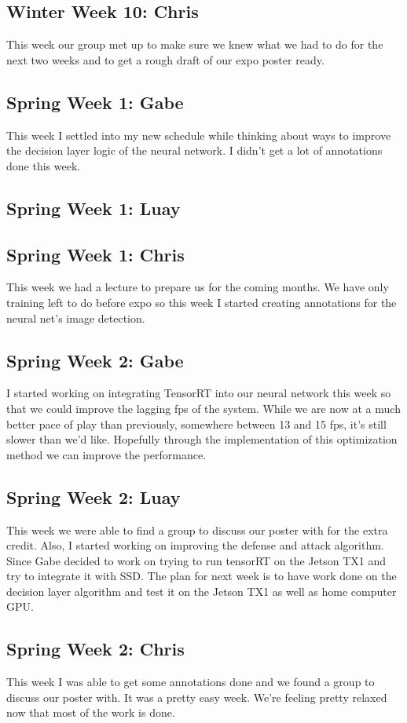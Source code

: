 \documentclass[onecolumn, draftclsnofoot,10pt, compsoc]{IEEEtran}
\begin{document}
\subsection{Winter Week 10: Chris}
This week our group met up to make sure we knew what we had to do for the next two weeks and to get a rough draft of our expo poster ready.
\subsection{Spring Week 1: Gabe}
This week I settled into my new schedule while thinking about ways to improve the decision layer logic of the neural network. I didn't get a lot of annotations done this week.
\subsection{Spring Week 1: Luay}
\subsection{Spring Week 1: Chris}
This week we had a lecture to prepare us for the coming months. We have only training left to do before expo so this week I started creating annotations for the neural net's image detection.
\subsection{Spring Week 2: Gabe}
I started working on integrating TensorRT into our neural network this week so that we could improve the lagging fps of the system. While we are now at a much better pace of play than previously, somewhere between 13 and 15 fps, it's still slower than we'd like. Hopefully through the implementation of this optimization method we can improve the performance.
\subsection{Spring Week 2: Luay}
This week we were able to find a group to discuss our poster with for the extra credit. Also, I started working on improving the defense and attack algorithm. Since Gabe decided to work on trying to run tensorRT on the Jetson TX1 and try to integrate it with SSD. The plan for next week is to have work done on the decision layer algorithm and test it on the Jetson TX1 as well as home computer GPU.
\subsection{Spring Week 2: Chris}
This week I was able to get some annotations done and we found a group to discuss our poster with. It was a pretty easy week. We're feeling pretty relaxed now that most of the work is done.
\end{document}

